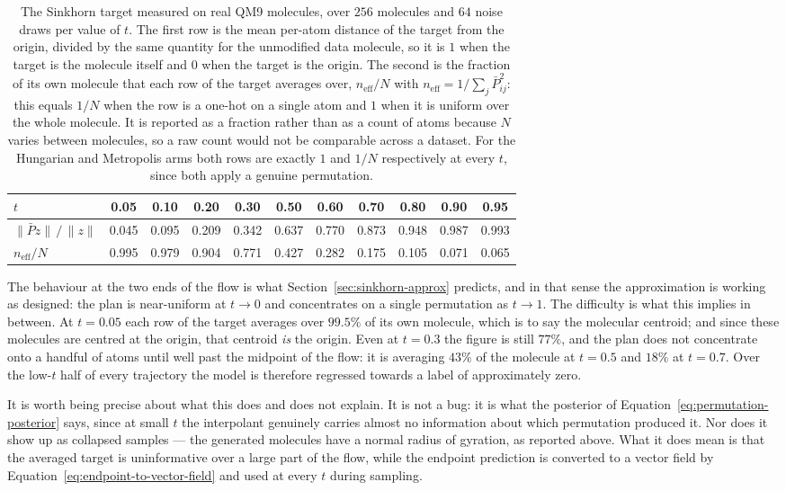 \begin{table}[h]
\centering
\small
\begin{tabular}{lcccccccccc}
\hline
$t$ & 0.05 & 0.10 & 0.20 & 0.30 & 0.50 & 0.60 & 0.70 & 0.80 & 0.90 & 0.95 \\
\hline
$\|\bar{P}z\| \,/\, \|z\|$ & 0.045 & 0.095 & 0.209 & 0.342 & 0.637 & 0.770 & 0.873 & 0.948 & 0.987 & 0.993 \\
$n_{\text{eff}} / N$       & 0.995 & 0.979 & 0.904 & 0.771 & 0.427 & 0.282 & 0.175 & 0.105 & 0.071 & 0.065 \\
\hline
\end{tabular}
\caption{The Sinkhorn target measured on real QM9 molecules, over $256$ molecules and $64$ noise
draws per value of $t$. The first row is the mean per-atom distance of the target from the origin,
divided by the same quantity for the unmodified data molecule, so it is $1$ when the target is the
molecule itself and $0$ when the target is the origin. The second is the fraction of its own
molecule that each row of the target averages over,
$n_{\text{eff}} / N$ with $n_{\text{eff}} = 1 / \sum_j \bar{P}_{ij}^2$: this equals $1/N$ when the
row is a one-hot on a single atom and $1$ when it is uniform over the whole molecule. It is
reported as a fraction rather than as a count of atoms because $N$ varies between molecules, so a
raw count would not be comparable across a dataset. For the Hungarian and Metropolis arms both rows
are exactly $1$ and $1/N$ respectively at every $t$, since both apply a genuine permutation.}
\label{tab:target-collapse}
\end{table}

The behaviour at the two ends of the flow is what Section~\ref{sec:sinkhorn-approx} predicts, and in
that sense the approximation is working as designed: the plan is near-uniform at $t \to 0$ and
concentrates on a single permutation as $t \to 1$. The difficulty is what this implies in between.
At $t = 0.05$ each row of the target averages over $99.5\%$ of its own molecule, which is to say the
molecular centroid; and since these molecules are centred at the origin, that centroid \emph{is} the
origin. Even at $t = 0.3$ the figure is still $77\%$, and the plan does not concentrate onto a handful of
atoms until well past the midpoint of the flow: it is averaging $43\%$ of the molecule at $t = 0.5$
and $18\%$ at $t = 0.7$. Over the low-$t$ half of every trajectory the model
is therefore regressed towards a label of approximately zero.

It is worth being precise about what this does and does not explain. It is not a bug: it is what
the posterior of Equation~\eqref{eq:permutation-posterior} says, since at small $t$ the interpolant
genuinely carries almost no information about which permutation produced it. Nor does it show up as
collapsed samples --- the generated molecules have a normal radius of gyration, as reported above.
What it does mean is that the averaged target is uninformative over a large part of the flow, while
the endpoint prediction is converted to a vector field by
Equation~\eqref{eq:endpoint-to-vector-field} and used at every $t$ during sampling.

